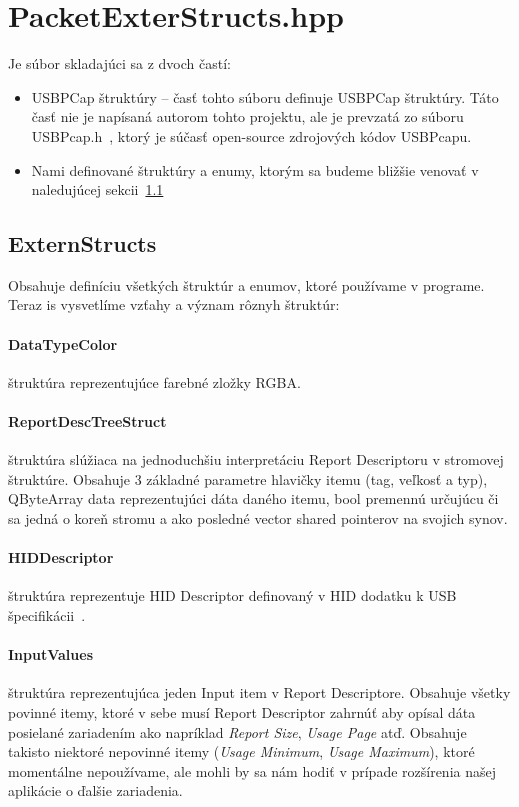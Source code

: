\section{PacketExterStructs.hpp}
Je súbor skladajúci sa z dvoch častí:
\begin{itemize}
\item USBPCap štruktúry -- časť tohto súboru definuje USBPCap štruktúry. Táto časť nie je napísaná autorom tohto projektu, ale je prevzatá zo súboru USBPcap.h~\cite{usbpcap_usbpcaph_file}, ktorý je súčasť open-source zdrojových kódov USBPcapu.
\item Nami definované štruktúry a enumy, ktorým sa budeme bližšie venovať v naledujúcej sekcii~\ref{kap04:sec:extern_structs}
\end{itemize}

\subsection{ExternStructs}
\label{kap04:sec:extern_structs}

Obsahuje definíciu všetkých štruktúr a enumov, ktoré používame v programe. Teraz is vysvetlíme vzťahy a význam rôznyh štruktúr:

\paragraph{DataTypeColor} štruktúra reprezentujúce farebné zložky RGBA.

\paragraph{ReportDescTreeStruct}\label{kap04:sec:report_tree_struct} štruktúra slúžiaca na jednoduchšiu interpretáciu Report Descriptoru v stromovej štruktúre. Obsahuje 3 základné parametre hlavičky itemu (tag, veľkosť a typ), QByteArray data reprezentujúci dáta daného itemu, bool premennú určujúcu či sa jedná o koreň stromu a ako posledné vector shared pointerov na svojich synov.

\paragraph{HIDDescriptor} štruktúra reprezentuje HID Descriptor definovaný v HID dodatku k USB špecifikácii~\cite{usbhid_hid_descriptor}.

\paragraph{InputValues} štruktúra reprezentujúca jeden Input item v Report Descriptore. Obsahuje všetky povinné itemy, ktoré v sebe musí Report Descriptor zahrnúť aby opísal dáta posielané zariadením ako napríklad \textit{Report Size}, \textit{Usage Page} atď. Obsahuje takisto niektoré nepovinné itemy (\textit{Usage Minimum}, \textit{Usage Maximum}), ktoré momentálne nepoužívame, ale mohli by sa nám hodiť v prípade rozšírenia našej aplikácie o ďalšie zariadenia.

